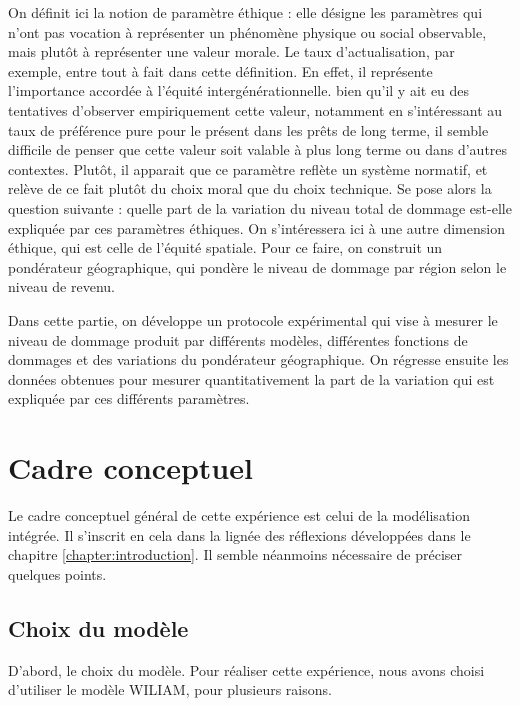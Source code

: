 On définit ici la notion de paramètre éthique : elle désigne les paramètres qui n'ont pas vocation à représenter un phénomène physique ou social observable, mais plutôt à représenter une valeur morale. Le taux d'actualisation, par exemple, entre tout à fait dans cette définition. En effet, il représente l'importance accordée à l'équité intergénérationnelle. bien qu'il y ait eu des tentatives d'observer empiriquement cette valeur, notamment en s'intéressant au taux de préférence pure pour le présent dans les prêts de long terme, il semble difficile de penser que cette valeur soit valable à plus long terme ou dans d'autres contextes. Plutôt, il apparait que ce paramètre reflète un système normatif, et relève de ce fait plutôt du choix moral que du choix technique. Se pose alors la question suivante : quelle part de la variation du niveau total de dommage est-elle expliquée par ces paramètres éthiques.  On s'intéressera ici à une autre dimension éthique, qui est celle de l'équité spatiale. Pour ce faire, on construit un pondérateur géographique, qui pondère le niveau de dommage par région selon le niveau de revenu.

Dans cette partie, on développe un protocole expérimental qui vise à mesurer le niveau de dommage produit par différents modèles, différentes fonctions de dommages et des variations du pondérateur géographique. On régresse ensuite les données obtenues pour mesurer quantitativement la part de la variation qui est expliquée par ces différents paramètres. 

\section{Cadre conceptuel}

Le cadre conceptuel général de cette expérience est celui de la modélisation intégrée. Il s'inscrit en cela dans la lignée des réflexions développées dans le chapitre \ref{chapter:introduction}. Il semble néanmoins nécessaire de préciser quelques points. \\

\subsection{Choix du modèle}

D'abord, le choix du modèle. Pour réaliser cette expérience, nous avons choisi d'utiliser le modèle WILIAM, pour plusieurs raisons. 

